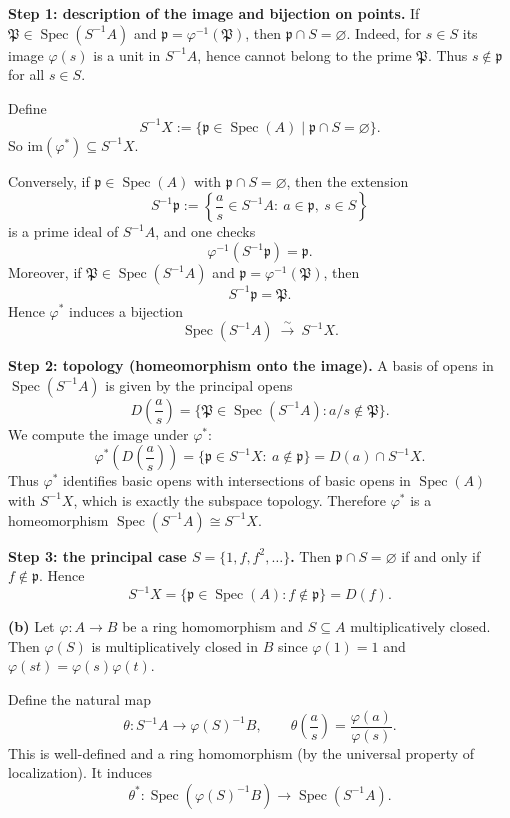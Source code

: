 \documentclass[12pt,a4paper]{article}
\DeclareMathOperator{\Spec}{Spec}
\theoremstyle{plain}
\theoremstyle{definition}      %
\begin{document}
	\medskip
	\textbf{Step 1: description of the image and bijection on points.}
	If $\mathfrak P\in\Spec(S^{-1}A)$ and $\mathfrak p=\varphi^{-1}(\mathfrak P)$, then $\mathfrak p\cap S=\varnothing$.
	Indeed, for $s\in S$ its image $\varphi(s)$ is a unit in $S^{-1}A$, hence cannot belong to the prime $\mathfrak P$.
	Thus $s\notin \mathfrak p$ for all $s\in S$.
	
	Define
	\[
	S^{-1}X:=\{\mathfrak p\in \Spec(A)\mid \mathfrak p\cap S=\varnothing\}.
	\]
	So $\mathrm{im}(\varphi^*)\subseteq S^{-1}X$.
	
	Conversely, if $\mathfrak p\in\Spec(A)$ with $\mathfrak p\cap S=\varnothing$, then the extension
	\[
	S^{-1}\mathfrak p:=\left\{\frac{a}{s}\in S^{-1}A:\ a\in \mathfrak p,\ s\in S\right\}
	\]
	is a prime ideal of $S^{-1}A$, and one checks
	\[
	\varphi^{-1}(S^{-1}\mathfrak p)=\mathfrak p.
	\]
	Moreover, if $\mathfrak P\in\Spec(S^{-1}A)$ and $\mathfrak p=\varphi^{-1}(\mathfrak P)$, then
	\[
	S^{-1}\mathfrak p=\mathfrak P.
	\]
	Hence $\varphi^*$ induces a bijection
	\[
	\Spec(S^{-1}A)\ \xrightarrow{\sim}\ S^{-1}X.
	\]
	
	\medskip
	\textbf{Step 2: topology (homeomorphism onto the image).}
	A basis of opens in $\Spec(S^{-1}A)$ is given by the principal opens
	\[
	D\!\left(\frac{a}{s}\right)=\{\mathfrak P\in \Spec(S^{-1}A): a/s\notin \mathfrak P\}.
	\]
	We compute the image under $\varphi^*$:
	\[
	\varphi^*\!\left(D\!\left(\frac{a}{s}\right)\right)
	=\{\mathfrak p\in S^{-1}X:\ a\notin \mathfrak p\}
	=D(a)\cap S^{-1}X.
	\]
	Thus $\varphi^*$ identifies basic opens with intersections of basic opens in $\Spec(A)$ with $S^{-1}X$,
	which is exactly the subspace topology. Therefore $\varphi^*$ is a homeomorphism
	$\Spec(S^{-1}A)\cong S^{-1}X$.
	
	\medskip
	\textbf{Step 3: the principal case $S=\{1,f,f^2,\dots\}$.}
	Then $\mathfrak p\cap S=\varnothing$ if and only if $f\notin \mathfrak p$. Hence
	\[
	S^{-1}X=\{\mathfrak p\in\Spec(A): f\notin\mathfrak p\}=D(f).
	\]
	
	\bigskip
	\textbf{(b)}
	Let $\varphi:A\to B$ be a ring homomorphism and $S\subseteq A$ multiplicatively closed.
	Then $\varphi(S)$ is multiplicatively closed in $B$ since $\varphi(1)=1$ and $\varphi(st)=\varphi(s)\varphi(t)$.
	
	Define the natural map
	\[
	\theta:S^{-1}A\longrightarrow \varphi(S)^{-1}B,\qquad \theta\!\left(\frac{a}{s}\right)=\frac{\varphi(a)}{\varphi(s)}.
	\]
	This is well-defined and a ring homomorphism (by the universal property of localization).
	It induces
	\[
	\theta^*:\Spec(\varphi(S)^{-1}B)\to \Spec(S^{-1}A).
	\]
	
\end{document}
